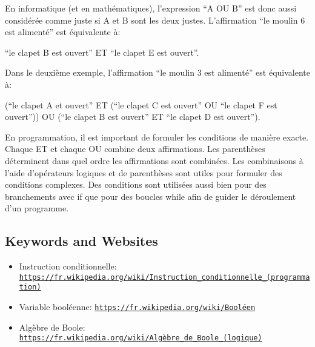 \documentclass[a4paper,11pt]{report}
\makeatletter
\renewenvironment{adjustwidth}[2]{%
    \begin{list}{}{%
    \partopsep\z@%
    \topsep\z@%
    \listparindent\parindent%
    \parsep\parskip%
    \@ifmtarg{#1}{\setlength{\leftmargin}{\z@}}%
                 {\setlength{\leftmargin}{#1}}%
    \@ifmtarg{#2}{\setlength{\rightmargin}{\z@}}%
                 {\setlength{\rightmargin}{#2}}%
    }
    \item[]}{\end{list}}
\newcommand{\BrochureUrlText}[1]{\texttt{#1}}
\newcommand{\BrochureInlineCode}[1]{{\ttfamily #1}}
\makeatother
\begin{document}
En informatique (et en mathématiques), l’expression “A OU B” est donc aussi considérée comme juste si A et B sont les deux justes.
L’affirmation “le moulin $6$ est alimenté” est équivalente à:

\begin{adjustwidth}{1.5em}{0em}
“le clapet B est ouvert” ET “le clapet E est ouvert”.
\end{adjustwidth}

Dans le deuxième exemple, l’affirmation “le moulin $3$ est alimenté” est équivalente à:

\begin{adjustwidth}{1.5em}{0em}
(“le clapet A et ouvert” ET (“le clapet C est ouvert” OU “le clapet F est ouvert”)) OU (“le clapet B est ouvert” ET “le clapet D est ouvert”).
\end{adjustwidth}

En programmation, il est important de formuler les conditions de manière exacte.
Chaque ET et chaque OU combine deux affirmations. Les parenthèses déterminent dans quel ordre les affirmations sont combinées.
Les combinaisons à l’aide d’opérateurs logiques et de parenthèses sont utiles pour formuler des conditions complexes. Des conditions sont utilisées aussi bien pour des branchements avec \BrochureInlineCode{if} que pour des boucles \BrochureInlineCode{while} afin de guider le déroulement d’un programme.

{\raggedright

\subsection*{Keywords and Websites}

\begin{itemize}
  \item Instruction conditionnelle: \href{https://fr.wikipedia.org/wiki/Instruction_conditionnelle_(programmation)}{\BrochureUrlText{https://fr.wikipedia.org/wiki/Instruction\_conditionnelle\_(programmation)}}
  \item Variable booléenne: \href{https://fr.wikipedia.org/wiki/Bool\%C3\%A9en}{\BrochureUrlText{https://fr.wikipedia.org/wiki/Booléen}}
  \item Algèbre de Boole: \href{https://fr.wikipedia.org/wiki/Alg\%C3\%A8bre_de_Boole_(logique)}{\BrochureUrlText{https://fr.wikipedia.org/wiki/Algèbre\_de\_Boole\_(logique)}}
\end{itemize}


}
\end{document}

